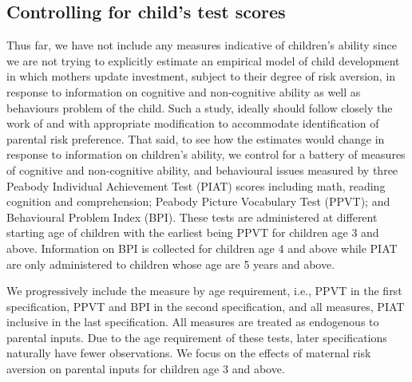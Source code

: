 \documentclass[emulatestandardclasses, 10pt, abstract = true]{scrartcl}
\begin{document}
\subsection{Controlling for child's test scores}

Thus far, we have not include any measures indicative of children's ability since we are not trying to explicitly estimate an empirical model of child development in which mothers update investment, subject to their degree of risk aversion, in response to information on cognitive and non-cognitive ability as well as behaviours problem of the child. Such a study, ideally should follow closely the work of \citet{cunha2007technology} and \citet{cunha2010estimating} with appropriate modification to accommodate identification of parental risk preference. That said, to see how the estimates would change in response to information on children's ability, we control for a battery of measures of cognitive and non-cognitive ability, and behavioural issues measured by three Peabody Individual Achievement Test (PIAT) scores including math, reading cognition and comprehension; Peabody Picture Vocabulary Test (PPVT); and Behavioural Problem Index (BPI). These tests are administered at different starting age of children with the earliest being PPVT for children age 3 and above. Information on BPI is collected for children age 4 and above while PIAT are only administered to children whose age are 5 years and above. 

We progressively include the measure by age requirement, i.e., PPVT in the first specification, PPVT and BPI in the second specification, and all measures, PIAT inclusive in the last specification. All measures are treated as endogenous to parental inputs. Due to the age requirement of these tests, later specifications naturally have fewer observations. We focus on the effects of maternal risk aversion on parental inputs for children age 3 and above.





\end{document}
